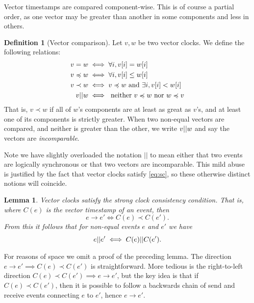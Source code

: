 \documentclass[]             %
{NASA}                       %
\newtheorem{lemma}[theorem]{Lemma}
\theoremstyle{definition}
\newtheorem{definition}{Definition}[section]
\begin{document}
Vector timestamps are compared component-wise. This is of course a
partial order, as one vector may be greater than another in some
components and less in others.
\begin{definition}[Vector comparison]
  Let $v, w$ be two vector clocks. We define the following relations:
  \begin{align*}
             v = w &\iff \forall i, v[i] = w[i] \\
  v \preccurlyeq w &\iff \forall i, v[i] \leq w[i] \\
         v \prec w &\iff v \preccurlyeq w \textrm{ and } \exists i, v[i] < w[i] \\
            v || w &\iff \textrm{ neither } v \preccurlyeq w \textrm{ nor } w \preccurlyeq v
  \end{align*}
  That is, $v \prec w$ if all of $w$'s components are at least as
  great as $v$'s, and at least one of its components is strictly
  greater. When two non-equal vectors are compared, and neither is
  greater than the other, we write $v || w$ and say the vectors
  are \emph{incomparable}.
\end{definition}

Note we have slightly overloaded the notation $||$ to mean either that
two events are logically synchronous or that two vectors are
incomparable. This mild abuse is justified by the fact that vector
clocks satisfy \ref{eq:sc}, so these otherwise distinct notions will
coincide.
\begin{lemma}
  Vector clocks satisfy the strong clock consistency condition. That
  is, where $C(e)$ is the vector timestamp of an event, then
  \[ e \to e' \iff C(e) \prec C(e'). \]
  From this it follows that for non-equal events $e$ and $e'$ we have
  \[ e || e' \iff C(e) || C(e'). \]
\end{lemma}

For reasons of space we omit a proof of the preceding lemma.  The
direction $e \to e' \implies C(e) \prec C(e')$ is
straightforward. More tedious is the right-to-left direction
$C(e) \prec C(e') \implies e \to e'$, but the key idea is that if
$C(e) \prec C(e')$, then it is possible to follow a backwards chain of
send and receive events connecting $e$ to $e'$, hence $e \to e'$.

\end{document}
